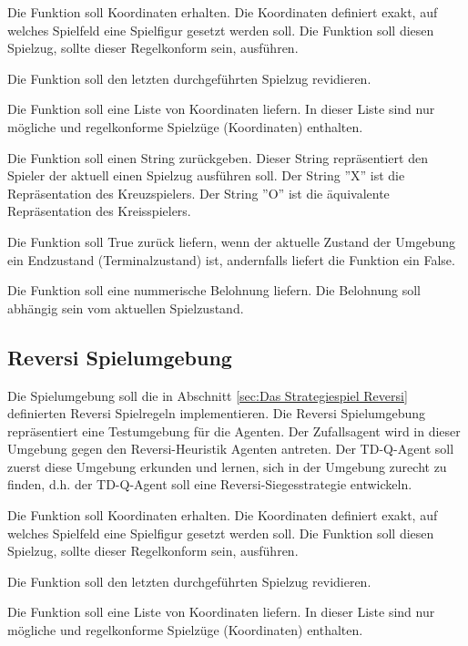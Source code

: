 Die Funktion soll Koordinaten erhalten. Die Koordinaten definiert exakt, auf welches Spielfeld eine Spielfigur gesetzt werden soll. Die Funktion soll diesen Spielzug, sollte dieser Regelkonform sein, ausführen.

Die Funktion soll den letzten durchgeführten Spielzug revidieren.

Die Funktion soll eine Liste von Koordinaten liefern. In dieser Liste sind nur mögliche und regelkonforme Spielzüge (Koordinaten) enthalten.

Die Funktion soll einen String zurückgeben. Dieser String repräsentiert den Spieler der aktuell einen Spielzug ausführen soll. Der String ''X'' ist die Repräsentation des Kreuzspielers. Der String ''O'' ist die äquivalente Repräsentation des Kreisspielers.

Die Funktion soll True zurück liefern, wenn der aktuelle Zustand der Umgebung ein Endzustand (Terminalzustand) ist, andernfalls liefert die Funktion ein False.

Die Funktion soll eine nummerische Belohnung liefern. Die Belohnung soll abhängig sein vom aktuellen Spielzustand.
\newpage

\subsection{Reversi Spielumgebung}
Die Spielumgebung soll die in Abschnitt \ref{sec:Das Strategiespiel Reversi} definierten Reversi Spielregeln implementieren. Die Reversi Spielumgebung repräsentiert eine Testumgebung für die Agenten. Der Zufallsagent wird in dieser Umgebung gegen den Reversi-Heuristik Agenten antreten. Der TD-Q-Agent soll zuerst diese Umgebung erkunden und lernen, sich in der Umgebung zurecht zu finden, d.h. der TD-Q-Agent soll eine Reversi-Siegesstrategie entwickeln. 

Die Funktion soll Koordinaten erhalten. Die Koordinaten definiert exakt, auf welches Spielfeld eine Spielfigur gesetzt werden soll. Die Funktion soll diesen Spielzug, sollte dieser Regelkonform sein, ausführen.

Die Funktion soll den letzten durchgeführten Spielzug revidieren.

Die Funktion soll eine Liste von Koordinaten liefern. In dieser Liste sind nur mögliche und regelkonforme Spielzüge (Koordinaten) enthalten.

